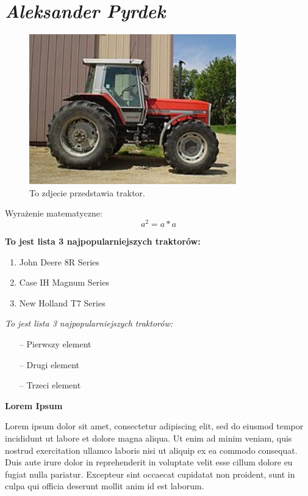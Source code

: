 \newpage
\section{\textit{Aleksander Pyrdek}}
\label{sec:apyrdek}


\begin{figure}[H]
    \centering
    \includegraphics[width=0.8\textwidth]{pictures/traktor.jpg} 
    \caption{To zdjecie przedstawia traktor.}
    \label{fig:traktor}
\end{figure}

Wyrażenie matematyczne: \[a^2 = a*a\]

\begin{table}[H]
    \centering
    
\end{table}

\textbf{To jest lista 3 najpopularniejszych traktorów:}

\begin{enumerate}
  \item John Deere 8R Series
  \item Case IH Magnum Series
  \item New Holland T7 Series
\end{enumerate}

\textit{To jest lista 3 najpopularniejszych traktorów:}

\begin{itemize}
  \item[--] Pierwszy element
  \item[--] Drugi element
  \item[--] Trzeci element
\end{itemize}

\textbf{Lorem Ipsum\\}

Lorem ipsum dolor sit amet, consectetur adipiscing elit, sed do eiusmod tempor incididunt ut labore et dolore magna aliqua. Ut enim ad minim veniam, quis nostrud exercitation ullamco laboris nisi ut aliquip ex ea commodo consequat. Duis aute irure dolor in reprehenderit in voluptate velit esse cillum dolore eu fugiat nulla pariatur. Excepteur sint occaecat cupidatat non proident, sunt in culpa qui officia deserunt mollit anim id est laborum.

